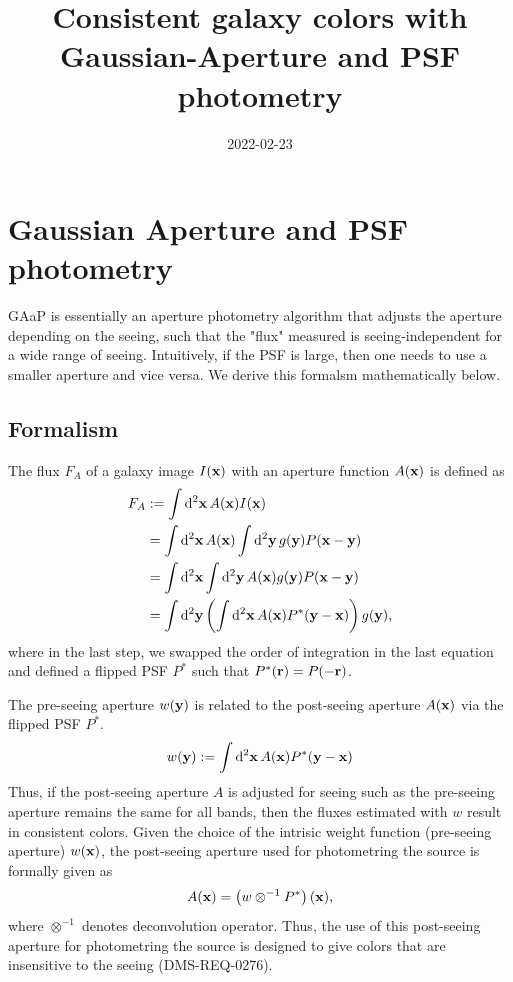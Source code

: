 \documentclass[DM,lsstdraft, authoryear,toc]{lsstdoc}
\title{Consistent galaxy colors with \\ Gaussian-Aperture and PSF photometry}
\date{2022-02-23}
\newcommand{\rmd}{\mathrm{d}^2}
\begin{document}
\maketitle


\section{Gaussian Aperture and PSF photometry}

GAaP is essentially an aperture photometry algorithm that adjusts the aperture depending on the seeing, such that the "flux" measured is seeing-independent for a wide range of seeing.
Intuitively, if the PSF is large, then one needs to use a smaller aperture and vice versa.
We derive this formalsm mathematically below.

\subsection{Formalism}
The flux $F_A$ of a galaxy image $I({\bf x})$ with an aperture function $A({\bf x})$ is defined as
\begin{align}
  F_A &:= \int\rmd{\bf x}\, A({\bf x}) I({\bf x}) \\
      &= \int\rmd{\bf x}\, A({\bf x}) \int\rmd{\bf y}\,g({\bf y}) P({\bf x}-{\bf y}) \\
      &= \int\rmd{\bf x}\int\rmd{\bf y}\, A({\bf x}) g({\bf y}) P({\bf x}-{\bf y}) \\
      &= \int\rmd{\bf y} \left(\int{\rmd}{\bf x}\, A({\bf x})P^*({\bf y}-{\bf x}) \right) g({\bf y}),
\end{align}
where in the last step, we swapped the order of integration in the last equation and defined a flipped PSF $P^*$ such that $P^*({\bf r}) = P(-{\bf r})$.

The pre-seeing aperture $w({\bf y})$ is related to the post-seeing aperture $A({\bf x})$ via the
flipped PSF $P^*$.
\begin{equation}
  w({\bf y}) := \int{\rmd}{\bf x}\, A({\bf x})P^*({\bf y}-{\bf x})
\end{equation}
Thus, if the post-seeing aperture $A$ is adjusted for seeing such as the pre-seeing aperture remains the same for all bands,
then the fluxes estimated with $w$ result in consistent colors. Given the choice of the intrisic weight function (pre-seeing aperture) $w({\bf x})$, the post-seeing aperture used for photometring the source is formally given as
\begin{equation}
  A({\bf x}) = \left(w \otimes^{-1} P^*\right)({\bf x}),
\end{equation}
where $\otimes^{-1}$ denotes deconvolution operator.
Thus, the use of this post-seeing aperture for photometring the source is designed to give colors that are insensitive to the seeing (DMS-REQ-0276).
\end{document}
